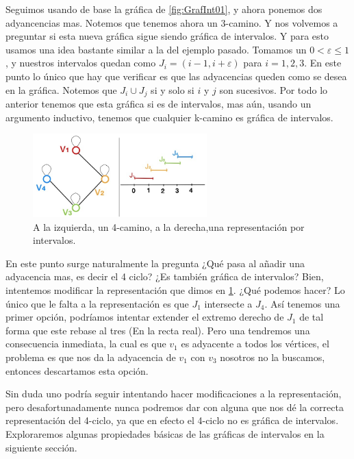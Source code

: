 Seguimos usando de base la gráfica de  \cref{fig:GrafInt01}, y ahora ponemos dos
adyancencias mas. Notemos que tenemos ahora un 3-camino. Y nos volvemos a
preguntar si esta nueva gráfica sigue siendo gráfica de intervalos. Y para esto
usamos una idea bastante similar a la del ejemplo pasado. Tomamos un $0 <
\varepsilon \leq 1$, y nuestros intervalos quedan como $J_i=(i-1,
i+\varepsilon)$ para $i=1,2,3$. En este punto lo único que hay que verificar es
que las adyacencias queden como se desea en la gráfica. Notemos que $J_i \cup
J_j $ si y solo si $i$ y $j$ son sucesivos. Por todo lo anterior tenemos que
esta gráfica si es de intervalos, mas aún, usando un argumento inductivo,
tenemos que cualquier k-camino es gráfica de intervalos.


\begin{figure}[H]
  \centering
  \includegraphics[width=0.6\textwidth]{recursos/capturas/203.jpg}
  \caption{A la izquierda, un 4-camino, a la derecha,una representación por intervalos.}
  \label{fig:GrafInt03}
\end{figure}

En este punto surge naturalmente la pregunta ¿Qué pasa al añadir una adyacencia
mas, es decir el 4 ciclo? ¿Es también gráfica de intervalos? Bien, intentemos
modificar la representación que dimos en \cref{fig:GrafInt03}. ¿Qué podemos
hacer? Lo único que le falta a la representación es que $J_1$ intersecte a
$J_4$. Así tenemos una primer opción, podríamos intentar extender el extremo
derecho de $J_1$ de tal forma que este rebase al tres (En la recta real). Pero
una tendremos una consecuencia inmediata, la cual es que $v_1$ es adyacente a
todos los vértices, el problema es que nos da la adyacencia de $v_1$ con $v_3$
nosotros no la buscamos, entonces descartamos esta opción.

Sin duda uno podría seguir intentando hacer modificaciones a la representación,
pero desafortunadamente nunca podremos dar con alguna que nos dé la correcta
representación del 4-ciclo, ya que en efecto el 4-ciclo no es gráfica de
intervalos.   Exploraremos algunas propiedades b\'asicas de las gr\'aficas de
intervalos en la siguiente secci\'on.

